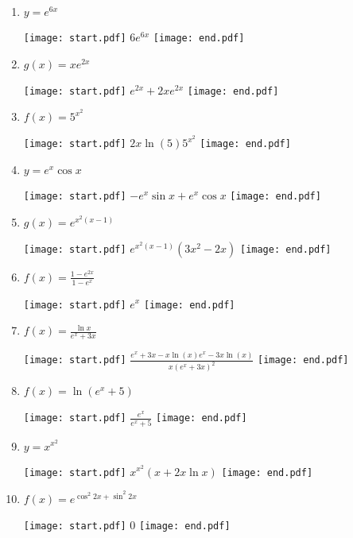 \documentclass[12pt]{article}
\begin{document}
\begin{enumerate}

\item $y = e^{6x}$ 

\texttt{[image: start.pdf]}
{{$6e^{6x}$}}
\texttt{[image: end.pdf]}


\item $g(x) = xe^{2x}$ 

\texttt{[image: start.pdf]}
{{$e^{2x}+2xe^{2x}$}}
\texttt{[image: end.pdf]}


\item $f(x) = 5^{x^2}$ 

\texttt{[image: start.pdf]}
{{$2x\ln{(5)}5^{x^2}$}}
\texttt{[image: end.pdf]}


\item $y = e^x\cos {x}$ 

\texttt{[image: start.pdf]}
{{$-e^{x}\sin{x}+e^{x}\cos{x}$}}
\texttt{[image: end.pdf]}


\item $g(x) = e^{x^2(x-1)}$ 

\texttt{[image: start.pdf]}
{{$e^{x^2(x-1)}(3x^2-2x)$}}
\texttt{[image: end.pdf]}


\item $f(x) = \frac{1-e^{2x}}{1-e^x}$ 

\texttt{[image: start.pdf]}
{{$e^x$}}
\texttt{[image: end.pdf]}


\item $f(x) = \frac{\ln{x}}{e^{x}+3x}$ 

\texttt{[image: start.pdf]}
{{$\frac{e^x+3x-x\ln{(x)}e^x-3x\ln{(x)}}{x(e^x+3x)^2}$}}
\texttt{[image: end.pdf]}


\item $f(x) = \ln{(e^{x}+5)}$ 

\texttt{[image: start.pdf]}
{{$\frac{e^{x}}{e^{x}+5}$}}
\texttt{[image: end.pdf]}


\item $y=x^{x^2}$

\texttt{[image: start.pdf]}
{{$x^{x^2}(x+2x\ln{x})$}}
\texttt{[image: end.pdf]}


\item $f(x) = e^{\cos^2{2x}+\sin^2{2x}}$ 

\texttt{[image: start.pdf]}
{{0}}
\texttt{[image: end.pdf]}



\end{enumerate}
\end{document}
